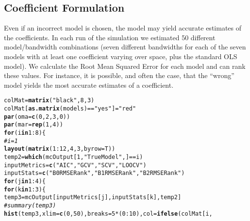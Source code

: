 \documentclass{article}\usepackage[]{graphicx}\usepackage[]{color}
\makeatletter
\newcommand{\hlnum}[1]{\textcolor[rgb]{0.686,0.059,0.569}{#1}}%
\newcommand{\hlstr}[1]{\textcolor[rgb]{0.192,0.494,0.8}{#1}}%
\newcommand{\hlcom}[1]{\textcolor[rgb]{0.678,0.584,0.686}{\textit{#1}}}%
\newcommand{\hlopt}[1]{\textcolor[rgb]{0,0,0}{#1}}%
\newcommand{\hlstd}[1]{\textcolor[rgb]{0.345,0.345,0.345}{#1}}%
\newcommand{\hlkwa}[1]{\textcolor[rgb]{0.161,0.373,0.58}{\textbf{#1}}}%
\newcommand{\hlkwb}[1]{\textcolor[rgb]{0.69,0.353,0.396}{#1}}%
\newcommand{\hlkwc}[1]{\textcolor[rgb]{0.333,0.667,0.333}{#1}}%
\newcommand{\hlkwd}[1]{\textcolor[rgb]{0.737,0.353,0.396}{\textbf{#1}}}%
\newenvironment{kframe}{%
 \def\at@end@of@kframe{}%
 \ifinner\ifhmode%
  \def\at@end@of@kframe{\end{minipage}}%
  \begin{minipage}{\columnwidth}%
 \fi\fi%
 \def\FrameCommand##1{\hskip\@totalleftmargin \hskip-\fboxsep
 \colorbox{shadecolor}{##1}\hskip-\fboxsep
     \hskip-\linewidth \hskip-\@totalleftmargin \hskip\columnwidth}%
 \MakeFramed {\advance\hsize-\width
   \@totalleftmargin\z@ \linewidth\hsize
   \@setminipage}}%
 {\par\unskip\endMakeFramed%
 \at@end@of@kframe}
\newenvironment{knitrout}{}{} %
\makeatother
\begin{document}
\subsection{Coefficient Formulation}

Even if an incorrect model is chosen, the model may yield accurate estimates of the coefficients. In each run of the simulation we estimated 50 different model/bandwidth combinations (seven different bandwidths for each of the seven models with at least one coefficient varying over space, plus the standard OLS model). We calculate the Root Mean Squared Error for each model and can rank these values. For instance, it is possible, and often the case, that the ``wrong'' model yields the most accurate estimates of a coefficient.

\begin{knitrout}
\color{fgcolor}\begin{kframe}
\begin{alltt}
\hlstd{colMat} \hlkwb{=} \hlkwd{matrix}\hlstd{(}\hlstr{"black"}\hlstd{,} \hlnum{8}\hlstd{,} \hlnum{3}\hlstd{)}
\hlstd{colMat[}\hlkwd{as.matrix}\hlstd{(models)} \hlopt{==} \hlstr{"yes"}\hlstd{]} \hlkwb{=} \hlstr{"red"}
\hlkwd{par}\hlstd{(}\hlkwc{oma} \hlstd{=} \hlkwd{c}\hlstd{(}\hlnum{0}\hlstd{,} \hlnum{2}\hlstd{,} \hlnum{3}\hlstd{,} \hlnum{0}\hlstd{))}
\hlkwd{par}\hlstd{(}\hlkwc{mar} \hlstd{=} \hlkwd{rep}\hlstd{(}\hlnum{1}\hlstd{,} \hlnum{4}\hlstd{))}
\hlkwa{for} \hlstd{(i} \hlkwa{in} \hlnum{1}\hlopt{:}\hlnum{8}\hlstd{) \{}
    \hlcom{# i = 1}
    \hlkwd{layout}\hlstd{(}\hlkwd{matrix}\hlstd{(}\hlnum{1}\hlopt{:}\hlnum{12}\hlstd{,} \hlnum{4}\hlstd{,} \hlnum{3}\hlstd{,} \hlkwc{byrow} \hlstd{= T))}
    \hlstd{temp2} \hlkwb{=} \hlkwd{which}\hlstd{(mcOutput[}\hlnum{1}\hlstd{,} \hlstr{"True Model"}\hlstd{, ]} \hlopt{==} \hlstd{i)}
    \hlstd{inputMetrics} \hlkwb{=} \hlkwd{c}\hlstd{(}\hlstr{"AIC"}\hlstd{,} \hlstr{"GCV"}\hlstd{,} \hlstr{"SCV"}\hlstd{,} \hlstr{"LOOCV"}\hlstd{)}
    \hlstd{inputStats} \hlkwb{=} \hlkwd{c}\hlstd{(}\hlstr{"B0RMSE Rank"}\hlstd{,} \hlstr{"B1RMSE Rank"}\hlstd{,} \hlstr{"B2RMSE Rank"}\hlstd{)}
    \hlkwa{for} \hlstd{(j} \hlkwa{in} \hlnum{1}\hlopt{:}\hlnum{4}\hlstd{) \{}
        \hlkwa{for} \hlstd{(k} \hlkwa{in} \hlnum{1}\hlopt{:}\hlnum{3}\hlstd{) \{}
            \hlstd{temp3} \hlkwb{=} \hlstd{mcOutput[inputMetrics[j], inputStats[k], temp2]}
            \hlcom{# summary(temp3)}
            \hlkwd{hist}\hlstd{(temp3,} \hlkwc{xlim} \hlstd{=} \hlkwd{c}\hlstd{(}\hlnum{0}\hlstd{,} \hlnum{50}\hlstd{),} \hlkwc{breaks} \hlstd{=} \hlnum{5} \hlopt{*} \hlstd{(}\hlnum{0}\hlopt{:}\hlnum{10}\hlstd{),} \hlkwc{col} \hlstd{=} \hlkwd{ifelse}\hlstd{(colMat[i,}

\end{alltt}
\end{kframe}
\end{knitrout}
\end{document}
